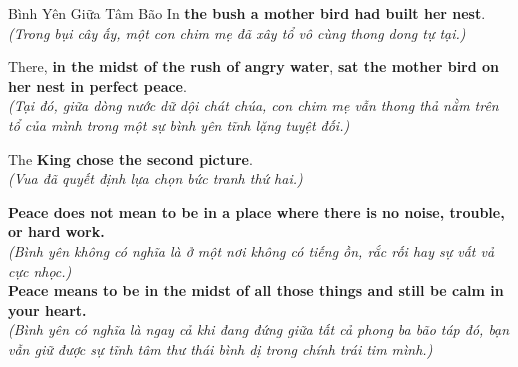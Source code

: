 \begin{truyen}{Bình Yên Giữa Tâm Bão}
In \textbf{the bush a mother bird had built her nest}.\\
\textit{(Trong bụi cây ấy, một con chim mẹ đã xây tổ vô cùng thong dong tự tại.)}

There, \textbf{in the midst of the rush of angry water}, \textbf{sat the mother bird on her nest in perfect peace}.\\
\textit{(Tại đó, giữa dòng nước dữ dội chát chúa, con chim mẹ vẫn thong thả nằm trên tổ của mình trong một sự bình yên tĩnh lặng tuyệt đối.)}

The \textbf{King chose the second picture}.\\
\textit{(Vua đã quyết định lựa chọn bức tranh thứ hai.)}
\end{truyen}

\begin{baihoc}
  \textbf{Peace does not mean to be in a place where there is no noise, trouble, or hard work.}\\
  \textit{(Bình yên không có nghĩa là ở một nơi không có tiếng ồn, rắc rối hay sự vất vả cực nhọc.)}\\
  \textbf{Peace means to be in the midst of all those things and still be calm in your heart.}\\
  \textit{(Bình yên có nghĩa là ngay cả khi đang đứng giữa tất cả phong ba bão táp đó, bạn vẫn giữ được sự tĩnh tâm thư thái bình dị trong chính trái tim mình.)}
\end{baihoc}

\vspace{0.8cm}


\ngayDay{}

